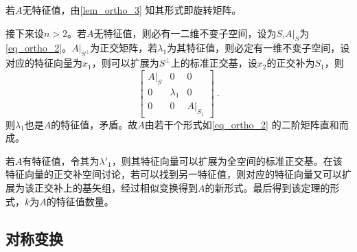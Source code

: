 若$A$无特征值，由\autoref{lem_ortho_3} 知其形式即旋转矩阵。

接下来设$n>2$。若$A$无特征值，则必有一二维不变子空间，设为$S$,$A|_{S}$为\autoref{eq_ortho_2}。$A|_{S^{\bot}}$为正交矩阵，若$\lambda_1$为其特征值，则必定有一维不变子空间，设对应的特征向量为$x_1$，则可以扩展为$S^{\bot}$上的标准正交基，设$x_2$的正交补为$S_1$，则
\begin{equation}
\left[\begin{array}{rrr}
A|_{S}&0&0\\
0&\lambda_1&0\\
0&0&A|_{S_1}
\end{array}
\right]~.
\end{equation}
则$\lambda_1$也是$A$的特征值，矛盾。故$A$由若干个形式如\autoref{eq_ortho_2} 的二阶矩阵直和而成。

若$A$有特征值，令其为$\lambda'_1$，则其特征向量可以扩展为全空间的标准正交基。在该特征向量的正交补空间讨论，若可以找到另一特征值，则对应的特征向量又可以扩展为该正交补上的基矢组，经过相似变换得到$A$的新形式。最后得到该定理的形式，$k$为$A$的特征值数量。
\subsection{对称变换}


